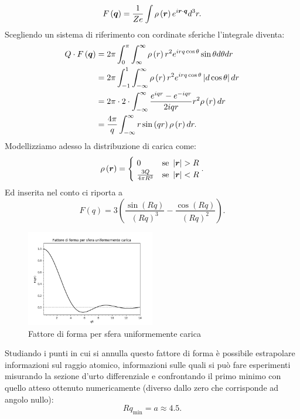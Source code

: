 \[
	F\left( \boldsymbol{q} \right) = \frac{1}{Ze}\int \rho\left( \boldsymbol{r} \right) e^{i \boldsymbol{r}\cdot \boldsymbol{q}}d^3r
.\] 
Scegliendo un sistema di riferimento con cordinate sferiche l'integrale diventa:
\begin{align*}
	Q \cdot F\left( \boldsymbol{q} \right) &= 2\pi \int_{0}^{\pi} \int_{\infty}^{\infty}\rho\left( r \right) r^2e^{i rq \cos\theta}\sin\theta d\theta dr\\
	&=  2\pi \int_{-1}^{1} \int_{-\infty}^{\infty}\rho\left( r \right) r^2e^{i rq \cos\theta}\left|d\cos\theta\right|dr\\
	&=  2\pi\cdot  2 \cdot \int_{-\infty}^{\infty} \frac{e^{iqr}-e^{-iqr}}{2iqr} r^2 \rho\left( r \right) dr  \\
	&=  \frac{4\pi}{q} \int_{-\infty}^{\infty} r\sin\left( qr \right) \rho\left( r \right) dr 
.\end{align*}
Modellizziamo adesso la distribuzione di carica come:
\[
	\rho\left( \boldsymbol{r} \right) = 
	\begin{cases}
		\ 0 & \text{se } \left| \boldsymbol{r} \right| > R \\ 
		\ \frac{3Q}{4\pi R^3} & \text{se } \left| \boldsymbol{r} \right| < R 
	\end{cases}
.\] 
Ed inserita nel conto ci riporta a 
\[
	F\left( q \right) = 3\left( \frac{\sin\left( Rq \right) }{\left( Rq \right)^3}- \frac{\cos\left( Rq \right) }{\left( Rq \right)^2} \right) 
.\] 
\begin{figure}[H]
	\centering
	\includegraphics[width=0.5\textwidth]{immagini/Form-factor-sphere.png}
	\caption{Fattore di forma per sfera uniformemente carica}
	\label{fig:immagini-Form-factor-sphere-png}
\end{figure}
Studiando i punti in cui si annulla questo fattore di forma è possibile estrapolare informazioni sul raggio atomico, informazioni sulle quali si può fare esperimenti misurando la sezione d'urto differenziale e confrontando il primo minimo con quello atteso ottenuto numericamente (diverso dallo zero che corrisponde ad angolo nullo): 
\[
	Rq_{\text{min}} = a \approx 4.5
.\] 
